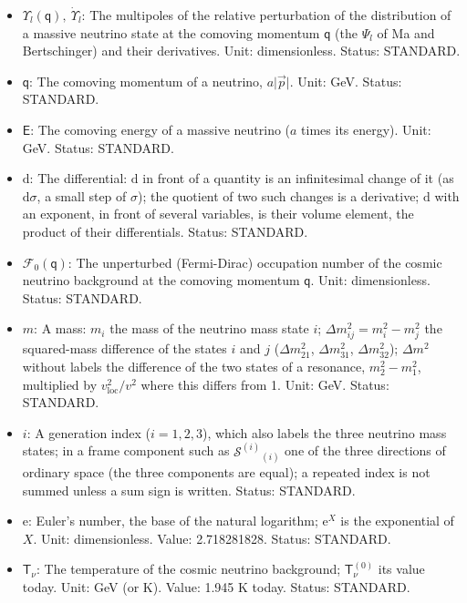 \documentclass[
  10pt,
]{article}
\begin{document}
\begin{itemize}
\item
  \(\Upsilon_l(\mathsf{q}),\ \dot\Upsilon_l\): The multipoles of the
  relative perturbation of the distribution of a massive neutrino state
  at the comoving momentum \(\mathsf{q}\) (the \(\Psi_l\) of Ma and
  Bertschinger) and their derivatives. Unit: dimensionless. Status:
  STANDARD.
\item
  \(\mathsf{q}\): The comoving momentum of a neutrino,
  \(a\lvert\vec p\rvert\). Unit: GeV. Status: STANDARD.
\item
  \(\mathsf{E}\): The comoving energy of a massive neutrino (\(a\) times
  its energy). Unit: GeV. Status: STANDARD.
\item
  \(\mathrm{d}\): The differential: \(\mathrm{d}\) in front of a
  quantity is an infinitesimal change of it (as \(\mathrm{d}\sigma\), a
  small step of \(\sigma\)); the quotient of two such changes is a
  derivative; \(\mathrm{d}\) with an exponent, in front of several
  variables, is their volume element, the product of their
  differentials. Status: STANDARD.
\item
  \(\mathcal{F}_0(\mathsf{q})\): The unperturbed (Fermi-Dirac)
  occupation number of the cosmic neutrino background at the comoving
  momentum \(\mathsf{q}\). Unit: dimensionless. Status: STANDARD.
\item
  \(m\): A mass: \(m_i\) the mass of the neutrino mass state \(i\);
  \(\Delta m_{ij}^2 = m_i^2 - m_j^2\) the squared-mass difference of the
  states \(i\) and \(j\) (\(\Delta m_{21}^2\), \(\Delta m_{31}^2\),
  \(\Delta m_{32}^2\)); \(\Delta m^2\) without labels the difference of
  the two states of a resonance, \(m_2^2 - m_1^2\), multiplied by
  \(v_{\mathrm{loc}}^2/v^2\) where this differs from 1. Unit: GeV.
  Status: STANDARD.
\item
  \(i\): A generation index (\(i = 1, 2, 3\)), which also labels the
  three neutrino mass states; in a frame component such as
  \(\mathcal{S}^{(i)}{}_{(i)}\) one of the three directions of ordinary
  space (the three components are equal); a repeated index is not summed
  unless a sum sign is written. Status: STANDARD.
\item
  \(\mathrm{e}\): Euler's number, the base of the natural logarithm;
  \(\mathrm{e}^{X}\) is the exponential of \(X\). Unit: dimensionless.
  Value: 2.718281828. Status: STANDARD.
\item
  \(\mathsf{T}_\nu\): The temperature of the cosmic neutrino background;
  \(\mathsf{T}_\nu^{(0)}\) its value today. Unit: GeV (or K). Value:
  1.945 K today. Status: STANDARD.
\end{itemize}
\end{document}
